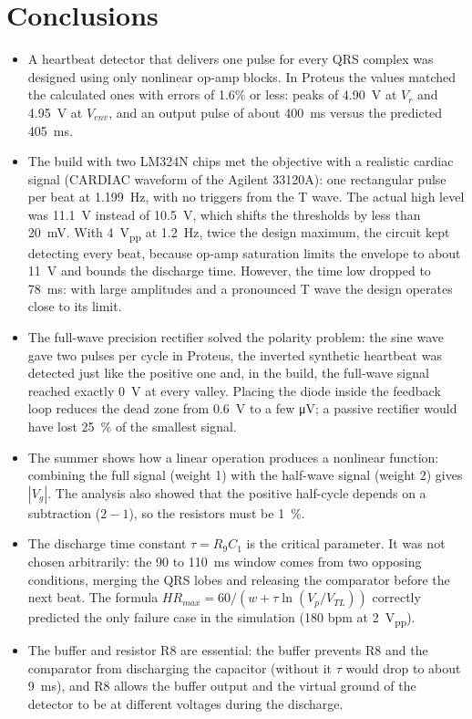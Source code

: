 \documentclass[11pt,letterpaper]{article}
\newcommand{\Vg}{V_g}
\newcommand{\Vr}{V_r}
\newcommand{\Venv}{V_{env}}
\newcommand{\VTL}{V_{TL}}
\begin{document}
\section{Conclusions}
\begin{itemize}
  \item A heartbeat detector that delivers one pulse for every QRS complex was designed using only nonlinear op-amp blocks. In Proteus the values matched the calculated ones with errors of 1.6\% or less: peaks of \SI{4.90}{V} at $\Vr$ and \SI{4.95}{V} at $\Venv$, and an output pulse of about \SI{400}{ms} versus the predicted \SI{405}{ms}.
  \item The build with two LM324N chips met the objective with a realistic cardiac signal (CARDIAC waveform of the Agilent 33120A): one rectangular pulse per beat at \SI{1.199}{Hz}, with no triggers from the T wave. The actual high level was \SI{11.1}{V} instead of \SI{10.5}{V}, which shifts the thresholds by less than \SI{20}{mV}. With \SI{4}{V_{pp}} at \SI{1.2}{Hz}, twice the design maximum, the circuit kept detecting every beat, because op-amp saturation limits the envelope to about \SI{11}{V} and bounds the discharge time. However, the time low dropped to \SI{78}{ms}: with large amplitudes and a pronounced T wave the design operates close to its limit.
  \item The full-wave precision rectifier solved the polarity problem: the sine wave gave two pulses per cycle in Proteus, the inverted synthetic heartbeat was detected just like the positive one and, in the build, the full-wave signal reached exactly \SI{0}{V} at every valley. Placing the diode inside the feedback loop reduces the dead zone from \SI{0.6}{V} to a few \si{\micro V}; a passive rectifier would have lost \SI{25}{\percent} of the smallest signal.
  \item The summer shows how a linear operation produces a nonlinear function: combining the full signal (weight 1) with the half-wave signal (weight 2) gives $|\Vg|$. The analysis also showed that the positive half-cycle depends on a subtraction ($2-1$), so the resistors must be \SI{1}{\percent}.
  \item The discharge time constant $\tau=R_9C_1$ is the critical parameter. It was not chosen arbitrarily: the 90 to \SI{110}{ms} window comes from two opposing conditions, merging the QRS lobes and releasing the comparator before the next beat. The formula $HR_{max}=60/(w+\tau\ln(V_p/\VTL))$ correctly predicted the only failure case in the simulation (180 bpm at \SI{2}{V_{pp}}).
  \item The buffer and resistor R8 are essential: the buffer prevents R8 and the comparator from discharging the capacitor (without it $\tau$ would drop to about \SI{9}{ms}), and R8 allows the buffer output and the virtual ground of the detector to be at different voltages during the discharge.

\end{itemize}
\end{document}
